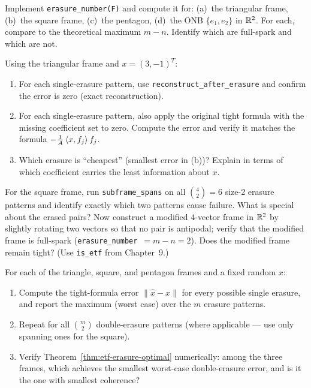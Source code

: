 \begin{exercisebox}[title={Lab Exercise 10.1: Erasure Numbers}]
Implement \texttt{erasure\_number(F)} and compute it for:
(a)~the triangular frame, (b)~the square frame, (c)~the pentagon,
(d)~the ONB $\{e_1,e_2\}$ in $\mathbb{R}^2$. For each, compare to the theoretical
maximum $m-n$. Identify which are full-spark and which are not.
\end{exercisebox}

\begin{exercisebox}[title={Lab Exercise 10.2: Sub-Frame Reconstruction}]
Using the triangular frame and $x=(3,-1)^T$:
\begin{enumerate}[label=(\alph*)]
  \item For each single-erasure pattern, use \texttt{reconstruct\_after\_erasure}
        and confirm the error is zero (exact reconstruction).
  \item For each single-erasure pattern, also apply the original tight formula
        with the missing coefficient set to zero. Compute the error and verify
        it matches the formula $-\tfrac{1}{A}\left\langle x, f_j \right\rangle f_j$.
  \item Which erasure is ``cheapest'' (smallest error in (b))? Explain in terms
        of which coefficient carries the least information about $x$.
\end{enumerate}
\end{exercisebox}

\begin{exercisebox}[title={Lab Exercise 10.3: The Square's Weakness}]
For the square frame, run \texttt{subframe\_spans} on all $\binom{4}{2}=6$
size-2 erasure patterns and identify exactly which two patterns cause failure.
What is special about the erased pairs? Now construct a modified
$4$-vector frame in $\mathbb{R}^2$ by slightly rotating two vectors so that no pair
is antipodal; verify that the modified frame is full-spark (\texttt{erasure\_number}~$=m-n=2$). Does the modified frame remain tight? (Use \texttt{is\_etf} from Chapter~9.)
\end{exercisebox}

\begin{exercisebox}[title={Lab Exercise 10.4: Worst-Case Erasure Error}]
For each of the triangle, square, and pentagon frames and a fixed random $x$:
\begin{enumerate}[label=(\alph*)]
  \item Compute the tight-formula error $\|\hat x-x\|$ for every possible
        single erasure, and report the maximum (worst case) over the $m$
        erasure patterns.
  \item Repeat for all $\binom{m}{2}$ double-erasure patterns (where applicable
        --- use only spanning ones for the square).
  \item Verify Theorem~\ref{thm:etf-erasure-optimal} numerically: among
        the three frames, which achieves the smallest worst-case
        double-erasure error, and is it the one with smallest coherence?
\end{enumerate}
\end{exercisebox}

